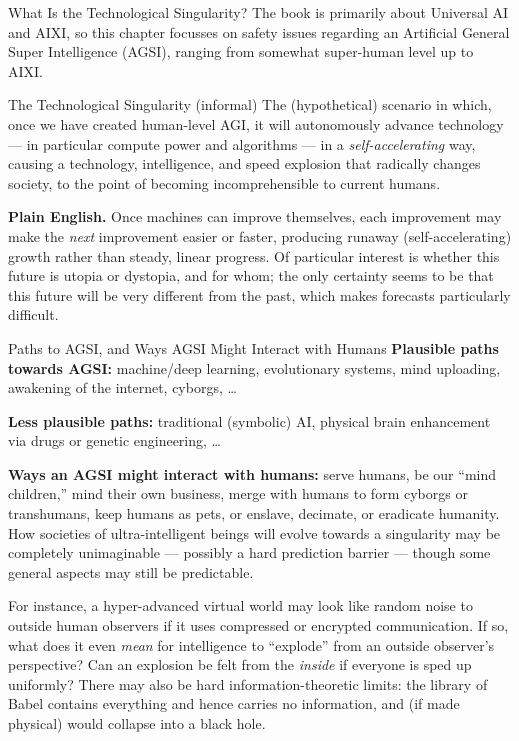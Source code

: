 \documentclass[aspectratio=169,10pt]{beamer}
\begin{document}
\begin{frame}{What Is the Technological Singularity?}
  The book is primarily about Universal AI and AIXI, so this chapter
  focusses on safety issues regarding an Artificial General Super
  Intelligence (AGSI), ranging from somewhat super-human level up to AIXI.

  \begin{block}{The Technological Singularity (informal)}
    The (hypothetical) scenario in which, once we have created human-level
    AGI, it will autonomously advance technology --- in particular compute
    power and algorithms --- in a \emph{self-accelerating} way, causing a
    technology, intelligence, and speed explosion that radically changes
    society, to the point of becoming incomprehensible to current humans.
  \end{block}

  \textbf{Plain English.} Once machines can improve themselves, each
  improvement may make the \emph{next} improvement easier or faster,
  producing runaway (self-accelerating) growth rather than steady, linear
  progress. Of particular interest is whether this future is utopia or
  dystopia, and for whom; the only certainty seems to be that this future
  will be very different from the past, which makes forecasts particularly
  difficult.
\end{frame}

\begin{frame}{Paths to AGSI, and Ways AGSI Might Interact with Humans}
  \textbf{Plausible paths towards AGSI:} machine/deep learning, evolutionary
  systems, mind uploading, awakening of the internet, cyborgs, \ldots

  \textbf{Less plausible paths:} traditional (symbolic) AI, physical brain
  enhancement via drugs or genetic engineering, \ldots

  \vspace{0.4em}
  \textbf{Ways an AGSI might interact with humans:} serve humans, be our
  ``mind children,'' mind their own business, merge with humans to form
  cyborgs or transhumans, keep humans as pets, or enslave, decimate, or
  eradicate humanity. How societies of ultra-intelligent beings will
  evolve towards a singularity may be completely unimaginable --- possibly
  a hard prediction barrier --- though some general aspects may still be
  predictable.

  \vspace{0.4em}
  For instance, a hyper-advanced virtual world may look like random noise
  to outside human observers if it uses compressed or encrypted
  communication. If so, what does it even \emph{mean} for intelligence to
  ``explode'' from an outside observer's perspective? Can an explosion be
  felt from the \emph{inside} if everyone is sped up uniformly? There may
  also be hard information-theoretic limits: the library of Babel contains
  everything and hence carries no information, and (if made physical)
  would collapse into a black hole.
\end{frame}
\end{document}
